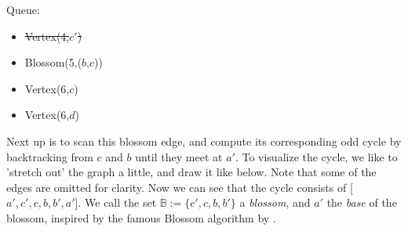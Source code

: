 \begin{minipage}{.75\linewidth}
\end{minipage}\hfill%
\begin{minipage}{.26\linewidth}
    Queue:
    \begin{itemize}
        \item \st{Vertex(4,$c'$)}
        \item Blossom(5,($b$,$c$))
        \item Vertex(6,$c$)
        \item Vertex(6,$d$)
    \end{itemize}
\end{minipage}

Next up is to scan this blossom edge, and compute its corresponding odd cycle by backtracking from $c$ and $b$ until they meet at $a'$. To visualize the cycle, we like to 'stretch out' the graph a little, and draw it like below. Note that some of the edges are omitted for clarity. Now we can see that the cycle consists of [$a',c',c,b,b',a'$]. We call the set $\mathbb{B} := \{c',c,b,b'\}$ a \emph{blossom}, and $a'$ the \emph{base} of the blossom, inspired by the famous Blossom algorithm by \cite{source:blossom}.


